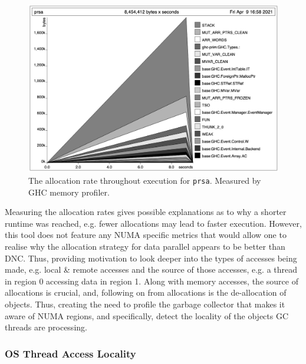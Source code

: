 \documentclass{paper}\usepackage{graphicx}
\begin{document}
\begin{figure}[!htb]
    \centering
    \includegraphics[width=0.75\linewidth]{Paper/images/prsa/prsa_hp.png}
    \caption{The allocation rate throughout execution for \lstinline{prsa}. Measured by GHC memory profiler.}
    \label{fig:prsa_hp}
\end{figure}

Measuring the allocation rates gives possible explanations as to why a shorter runtime was reached, e.g. fewer allocations may lead to faster execution. However, this tool does not feature any NUMA specific metrics that would allow one to realise why the allocation strategy for data parallel appears to be better than DNC. Thus, providing motivation to look deeper into the types of accesses being made, e.g. local \& remote accesses and the source of those accesses, e.g. a thread in region 0 accessing data in region 1. Along with memory accesses, the source of allocations is crucial, and, following on from allocations is the de-allocation of objects. Thus, creating the need to profile the garbage collector that makes it aware of NUMA regions, and specifically, detect the locality of the objects GC threads are processing.

\subsubsection{OS Thread Access Locality}
\label{sec:thread_access_locality}

\end{document}
